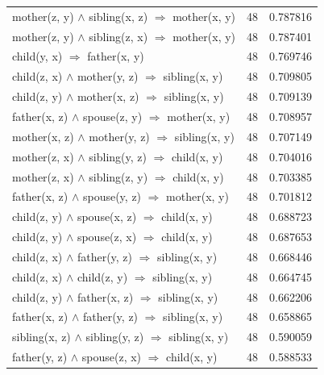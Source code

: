 \begin{longtable}{lrr}
     mother(z, y) $\wedge$ sibling(x, z)   $\Rightarrow$ mother(x, y) &           48 &        0.787816 \\
     mother(z, y) $\wedge$ sibling(z, x)   $\Rightarrow$ mother(x, y) &           48 &        0.787401 \\
                       child(y, x)   $\Rightarrow$ father(x, y) &           48 &        0.769746 \\
      child(z, x) $\wedge$ mother(y, z)   $\Rightarrow$ sibling(x, y) &           48 &        0.709805 \\
      child(z, y) $\wedge$ mother(x, z)   $\Rightarrow$ sibling(x, y) &           48 &        0.709139 \\
      father(x, z) $\wedge$ spouse(z, y)   $\Rightarrow$ mother(x, y) &           48 &        0.708957 \\
     mother(x, z) $\wedge$ mother(y, z)   $\Rightarrow$ sibling(x, y) &           48 &        0.707149 \\
      mother(z, x) $\wedge$ sibling(y, z)   $\Rightarrow$ child(x, y) &           48 &        0.704016 \\
      mother(z, x) $\wedge$ sibling(z, y)   $\Rightarrow$ child(x, y) &           48 &        0.703385 \\
      father(x, z) $\wedge$ spouse(y, z)   $\Rightarrow$ mother(x, y) &           48 &        0.701812 \\
        child(z, y) $\wedge$ spouse(x, z)   $\Rightarrow$ child(x, y) &           48 &        0.688723 \\
        child(z, y) $\wedge$ spouse(z, x)   $\Rightarrow$ child(x, y) &           48 &        0.687653 \\
      child(z, x) $\wedge$ father(y, z)   $\Rightarrow$ sibling(x, y) &           48 &        0.668446 \\
       child(z, x) $\wedge$ child(z, y)   $\Rightarrow$ sibling(x, y) &           48 &        0.664745 \\
      child(z, y) $\wedge$ father(x, z)   $\Rightarrow$ sibling(x, y) &           48 &        0.662206 \\
     father(x, z) $\wedge$ father(y, z)   $\Rightarrow$ sibling(x, y) &           48 &        0.658865 \\
   sibling(x, z) $\wedge$ sibling(y, z)   $\Rightarrow$ sibling(x, y) &           48 &        0.590059 \\
       father(y, z) $\wedge$ spouse(z, x)   $\Rightarrow$ child(x, y) &           48 &        0.588533 \\

\end{longtable}
